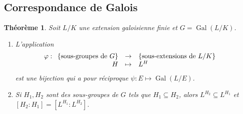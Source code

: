 \documentclass{article}
\DeclareMathOperator{\Gal}{Gal}
\newcommand{\applic}[4]{\begin{array}[t]{rcl}
#1 & \to & #2 \\
#3 & \mapsto & #4
\end{array}}
\theoremstyle{plain}
\newtheorem{theorem}{Théorème}[subsection]
\theoremstyle{definition}
\theoremstyle{remark}
\begin{document}
\subsection{Correspondance de Galois}

\begin{theorem}
    Soit $L/K$ une extension galoisienne finie et $G = \Gal(L/K)$.
    \begin{enumerate}
        \item L'application
        \[\varphi : \applic{\{\text{sous-groupes de $G$}\}}{\{\text{sous-extensions de $L/K$}\}}{H}{L^H}\]
        est une bijection qui a pour réciproque $\psi : E \mapsto \Gal(L/E)$.
        \item Si $H_1, H_2$ sont des sous-groupes de $G$ tels que $H_1 \subseteq H_2$, alors $L^{H_2} \subseteq L^{H_1}$ et $[H_2 : H_1] = [L^{H_1} : L^{H_2}]$.
    \end{enumerate}
\end{theorem}
\end{document}
